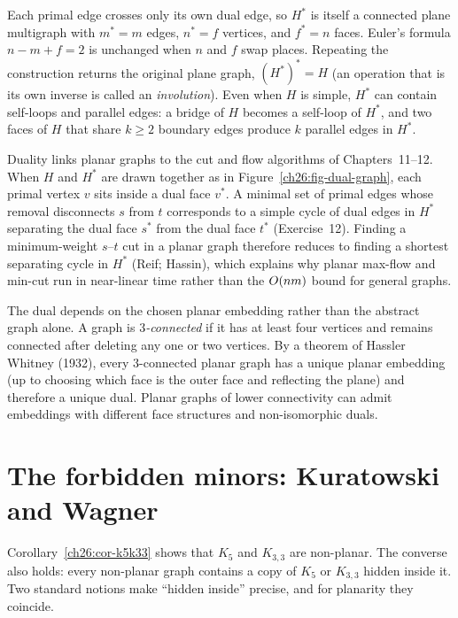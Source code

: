 Each primal edge crosses only its own dual edge, so $H^\ast$ is itself a connected plane
multigraph with $m^\ast = m$ edges, $n^\ast = f$ vertices, and $f^\ast = n$ faces. Euler's
formula $n - m + f = 2$ is unchanged when $n$ and $f$ swap places. Repeating the
construction returns the original plane graph, $(H^\ast)^\ast = H$ (an operation that is
its own inverse is called an \emph{involution}). Even when $H$ is simple, $H^\ast$ can
contain self-loops and parallel edges: a bridge of $H$ becomes a self-loop of $H^\ast$, and
two faces of $H$ that share $k \ge 2$ boundary edges produce $k$ parallel edges in $H^\ast$.

\begin{connectionbox}
Duality links planar graphs to the cut and flow algorithms of Chapters~11--12. When $H$ and
$H^\ast$ are drawn together as in Figure~\ref{ch26:fig-dual-graph}, each primal vertex $v$
sits inside a dual face $v^\ast$. A minimal set of primal edges whose removal disconnects
$s$ from $t$ corresponds to a simple cycle of dual edges in $H^\ast$ separating the dual
face $s^\ast$ from the dual face $t^\ast$ (Exercise~12). Finding a minimum-weight $s$--$t$
cut in a planar graph therefore reduces to finding a shortest separating cycle in $H^\ast$
(Reif; Hassin), which explains why planar max-flow and min-cut run in near-linear time
rather than the $O(nm)$ bound for general graphs.
\end{connectionbox}

\begin{remark}
The dual depends on the chosen planar embedding rather than the abstract graph alone. A
graph is \emph{$3$-connected} if it has at least four vertices and remains connected after
deleting any one or two vertices. By a theorem of Hassler Whitney (1932), every
$3$-connected planar graph has a unique planar embedding (up to choosing which face is the
outer face and reflecting the plane) and therefore a unique dual. Planar graphs of lower
connectivity can admit embeddings with different face structures and non-isomorphic duals.
\end{remark}

\section{The forbidden minors: Kuratowski and Wagner}
\label{ch26:kuratowski}

Corollary~\ref{ch26:cor-k5k33} shows that $K_5$ and $K_{3,3}$ are non-planar. The converse
also holds: every non-planar graph contains a copy of $K_5$ or $K_{3,3}$ hidden inside it.
Two standard notions make ``hidden inside'' precise, and for planarity they coincide.

